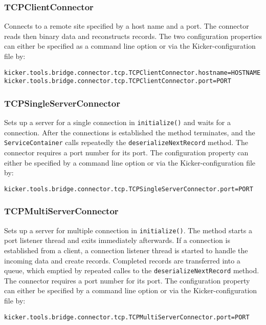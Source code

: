 \documentclass[11pt,a4paper]{article}
\begin{document}
%
\subsubsection{TCPClientConnector}

Connects to a remote site specified by a host name and a port. The connector reads then binary data and reconstructs records. The two configuration properties can either be specified as a command line option or via the Kicker-configuration file by:

\begin{verbatim}
kicker.tools.bridge.connector.tcp.TCPClientConnector.hostname=HOSTNAME
kicker.tools.bridge.connector.tcp.TCPClientConnector.port=PORT
\end{verbatim}

%
\subsubsection{TCPSingleServerConnector}

Sets up a server for a single connection in \texttt{initialize()} and waits for a connection. After the connections is established the method terminates, and the \texttt{ServiceContainer} calls repeatedly the \texttt{deserializeNextRecord} method. The connector requires a port number for its port. The configuration property can either be specified by a command line option or via the Kicker-configuration file by:

\begin{verbatim}
kicker.tools.bridge.connector.tcp.TCPSingleServerConnector.port=PORT
\end{verbatim}

%
\subsubsection{TCPMultiServerConnector}

Sets up a server for multiple connection in \texttt{initialize()}. The method starts a port listener thread and exits immediately afterwards. If a connection is established from a client, a connection listener thread is started to handle the incoming data and create records. Completed records are transferred into a queue, which emptied by repeated calles to the \texttt{deserializeNextRecord} method. The connector requires a port number for its port. The configuration property can either be specified by a command line option or via the Kicker-configuration file by:

\begin{verbatim}
kicker.tools.bridge.connector.tcp.TCPMultiServerConnector.port=PORT
\end{verbatim}
\end{document}
